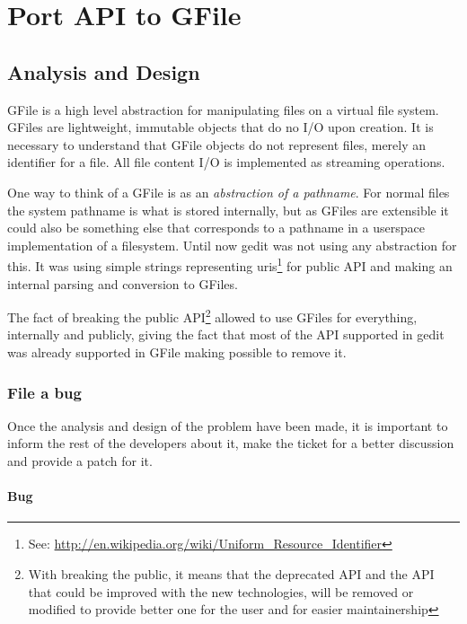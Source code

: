 
\chapter[Port API to GFile]{Port API to GFile}


\section{Analysis and Design}

GFile is a high level abstraction for manipulating files on a virtual file system. GFiles are lightweight, immutable objects that do no I/O upon creation. It is necessary to understand that GFile objects do not represent files, merely an identifier for a file. All file content I/O is implemented as streaming operations.

One way to think of a GFile is as an \emph{abstraction of a pathname}. For normal files the system pathname is what is stored internally, but as GFiles are extensible it could also be something else that corresponds to a pathname in a userspace implementation of a filesystem.\cite{website:gio} Until now gedit was not using any abstraction for this. It was using simple strings representing uris\footnote{See: \url{http://en.wikipedia.org/wiki/Uniform_Resource_Identifier}} for public API and making an internal parsing and conversion to GFiles.

The fact of breaking the public API\footnote{With breaking the public, it means that the deprecated API and the API that could be improved with the new technologies, will be removed or modified to provide better one for the user and for easier maintainership} allowed to use GFiles for everything, internally and publicly, giving the fact that most of the API supported in gedit was already supported in GFile making possible to remove it.

\subsection{File a bug}

Once the analysis and design of the problem have been made, it is important to inform the rest of the developers about it, make the ticket for a better discussion and provide a patch for it.

\subsubsection{Bug}

